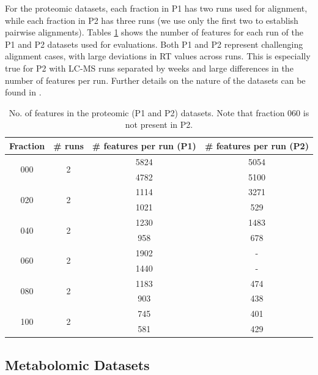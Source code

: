 For the proteomic datasets, each fraction in P1 has two runs used for alignment, while each fraction in P2 has three runs (we use only the first two to establish pairwise alignments). Tables \ref{tab:No.-of-features-P1} shows the number of features for each run of the P1 and P2 datasets used for evaluations. Both P1 and P2 represent challenging alignment cases, with large deviations in RT values across runs. This is especially true for P2 with LC-MS runs separated by weeks and large differences in the number of features per run. Further details on the nature of the datasets can be found in \cite{Lange2008}. 

\begin{table}[!htbp]
\noindent \begin{centering}
\begin{tabular}{|c|c|c|c|}
\hline 
Fraction & \# runs & \# features per run (P1) & \# features per run (P2)\tabularnewline
\hline 
\hline 
\multirow{2}{*}{000} & \multirow{2}{*}{2} & 5824 & 5054\tabularnewline
\cline{3-4} 
 &  & 4782 & 5100\tabularnewline
\hline 
\multirow{2}{*}{020} & \multirow{2}{*}{2} & 1114 & 3271\tabularnewline
\cline{3-4} 
 &  & 1021 & 529\tabularnewline
\hline 
\multirow{2}{*}{040} & \multirow{2}{*}{2} & 1230 & 1483\tabularnewline
\cline{3-4} 
 &  & 958 & 678\tabularnewline
\hline 
\multirow{2}{*}{060} & \multirow{2}{*}{2} & 1902 & -\tabularnewline
\cline{3-4} 
 &  & 1440 & -\tabularnewline
\hline 
\multirow{2}{*}{080} & \multirow{2}{*}{2} & 1183 & 474\tabularnewline
\cline{3-4} 
 &  & 903 & 438\tabularnewline
\hline 
\multirow{2}{*}{100} & \multirow{2}{*}{2} & 745 & 401\tabularnewline
\cline{3-4} 
 &  & 581 & 429\tabularnewline
\hline 
\end{tabular}
\par\end{centering}
\caption{\label{tab:No.-of-features-P1}No. of features in the proteomic (P1 and P2) datasets. Note that fraction 060 is not present in P2.}
\end{table}


\subsection{Metabolomic Datasets\label{sub:metabolomic-dataset}}

